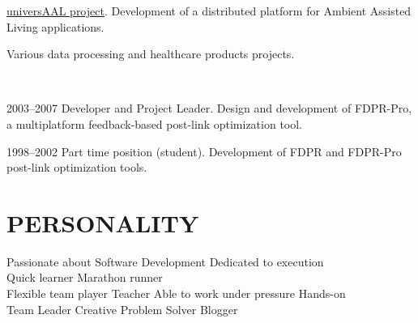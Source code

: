 \documentclass[]{deedy-resume}
\begin{document}
\begin{minipage}[t]{0.66\textwidth}
\vspace{\topsep} %
\begin{tightemize}
\item \href{https://cordis.europa.eu/project/id/247950}{universAAL project}. Development of a distributed platform for Ambient Assisted Living applications.
\item Various data processing and healthcare products projects.
\end{tightemize}
\sectionsep

 \\
\vspace{\topsep} %
\begin{tightemize}
\item 2003--2007 Developer and Project Leader. Design and development of FDPR-Pro, a multiplatform feedback-based post-link optimization tool.
\item  1998--2002 Part time position (student). Development of FDPR and FDPR-Pro post-link optimization tools.
\end{tightemize}
\sectionsep


\section{PERSONALITY}
Passionate about Software Development \textbullet{} Dedicated to execution\\
Quick learner \textbullet{} Marathon runner\\
Flexible team player \textbullet{} Teacher \textbullet{}  Able to work under pressure \textbullet{} Hands-on\\
Team Leader \textbullet{} Creative Problem Solver \textbullet{} Blogger


\end{minipage}
\end{document}
